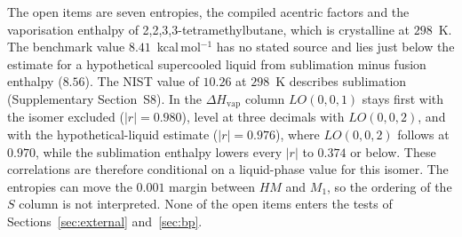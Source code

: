 \documentclass[a5paper, 10pt]{article}
\theoremstyle{plain}
\theoremstyle{remark}
\theoremstyle{definition}
\begin{document}
The open items are seven entropies, the compiled
acentric factors and the vaporisation enthalpy of
2,2,3,3-tetramethylbutane, which is crystalline at $298$~K. The benchmark value $8.41$~kcal\,mol$^{-1}$ has no stated source and lies just below the estimate for a hypothetical supercooled liquid from sublimation minus fusion enthalpy ($8.56$). The NIST value of $10.26$ at $298$~K
describes sublimation (Supplementary Section~S8). In the
$\Delta H_{\mathrm{vap}}$ column $LO(0,0,1)$ stays first with the isomer excluded ($|r| = 0.980$), level at three decimals with $LO(0,0,2)$, and with the hypothetical-liquid estimate
($|r| = 0.976$), where $LO(0,0,2)$ follows at $0.970$, while the sublimation enthalpy lowers every $|r|$ to
$0.374$ or below. These correlations are therefore conditional on a
liquid-phase value for this isomer. The entropies can move the $0.001$
margin between $HM$ and $M_1$, so the ordering of the $S$ column is not
interpreted. None of the open items enters the tests of
Sections~\ref{sec:external} and~\ref{sec:bp}.
\end{document}
